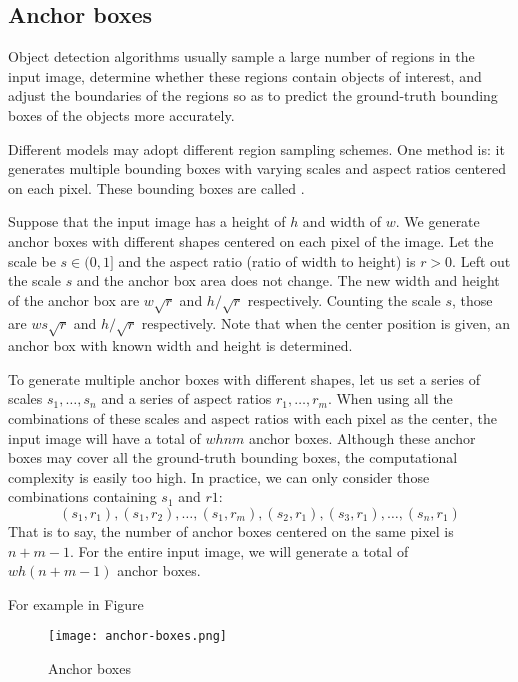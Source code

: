 \subsection{Anchor boxes}
\label{sec:anchor-boxes}

Object detection algorithms usually sample a large number of regions in the input image, determine whether these regions contain objects of interest, and adjust the boundaries of the regions so as to predict the ground-truth bounding boxes of the objects more accurately.

Different models may adopt different region sampling schemes.
One method is: it generates multiple bounding boxes with varying scales and aspect ratios centered on each pixel.
These bounding boxes are called . 



Suppose that the input image has a height of $h$ and width of $w$.
We generate anchor boxes with different shapes centered on each pixel of the image.
Let the scale be $s \in (0, 1]$ and the aspect ratio (ratio of width to height) is $r > 0$.
Left out the scale $s$ and the anchor box area does not change.
The new width and height of the anchor box are $w\sqrt{r}$ and $h/\sqrt{r}$ respectively.
Counting the scale $s$, those are $ws\sqrt{r}$ and $h/\sqrt{r}$ respectively.
Note that when the center position is given, an anchor box with known width and height is determined.


To generate multiple anchor boxes with different shapes, let us set a series of scales $s_{1}, \dots, s_{n}$ and a series of aspect ratios $r_{1}, \dots,r_{m}$.
When using all the combinations of these scales and aspect ratios with each pixel as the center, the input image will have a total of $whnm$ anchor boxes.
Although these anchor boxes may cover all the ground-truth bounding boxes, the computational complexity is easily too high.
In practice, we can only consider those combinations containing $s_{1}$ and $r{1}$:
\begin{equation}
  \label{eq:1}
  (s_{1}, r_{1}), (s_{1}, r_{2}), \dots, (s_{1}, r_{m}), (s_{2}, r_{1}), (s_{3}, r_{1}), \dots, (s_{n}, r_{1})
\end{equation}
That is to say, the number of anchor boxes centered on the same pixel is $n + m - 1$.
For the entire input image, we will generate a total of $wh(n + m - 1)$ anchor boxes.

For example in Figure
\begin{figure}[!ht]
  \centering
  \texttt{[image: anchor-boxes.png]}
  \caption{Anchor boxes}
  \label{fig:anchor-boxes}
\end{figure}


